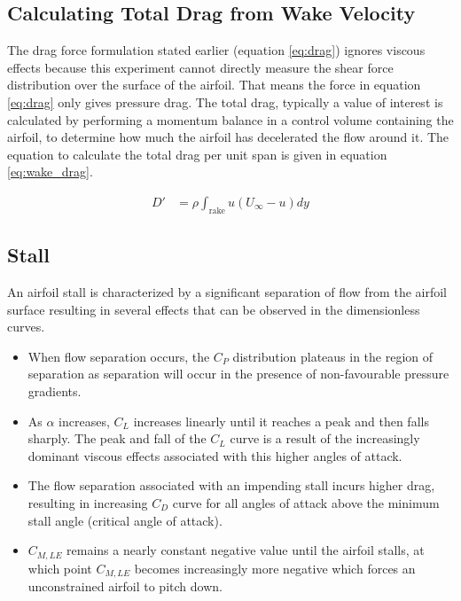 \documentclass[runningheads]{llncs}
\begin{document}
\subsection{Calculating Total Drag from Wake Velocity}

\noindent
The drag force formulation stated earlier (equation \ref{eq:drag}) ignores viscous effects because this experiment cannot directly measure the shear force distribution over the surface of the airfoil. That means the force in equation \ref{eq:drag} only gives pressure drag. The total drag, typically a value of interest is calculated by performing a momentum balance in a control volume containing the airfoil, to determine how much the airfoil has decelerated the flow around it. The equation to calculate the total drag per unit span is given in equation \ref{eq:wake_drag}.\newline

\begin{align}
    D' &= \rho\int_{\text{rake}} u (U_\infty - u) dy \label{eq:wake_drag}
\end{align}

\subsection{Stall}

\noindent
An airfoil stall is characterized by a significant separation of flow from the airfoil surface resulting in several effects that can be observed in the dimensionless curves.

\begin{itemize}

    \item When flow separation occurs, the $C_P$ distribution plateaus in the region of separation as separation will occur in the presence of non-favourable pressure gradients.
    
    \item As $\alpha$ increases, $C_L$ increases linearly until it reaches a peak and then falls sharply. The peak and fall of the $C_L$ curve is a result of the increasingly dominant viscous effects associated with this higher angles of attack.
    
    \item The flow separation associated with an impending stall incurs higher drag, resulting in increasing $C_D$ curve for all angles of attack above the minimum stall angle (critical angle of attack).
    
    \item $C_{M, LE}$ remains a nearly constant negative value until the airfoil stalls, at which point $C_{M, LE}$ becomes increasingly more negative which forces an unconstrained airfoil to pitch down.
    
\end{itemize}
\end{document}
